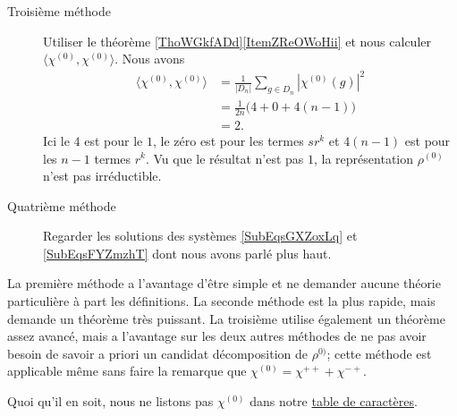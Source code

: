 \begin{enumerate}
\begin{description}
    \item[Troisième méthode]
        Utiliser le théorème \ref{ThoWGkfADd}\ref{ItemZReOWoHii} et nous calculer \( \langle \chi^{(0)}, \chi^{(0)}\rangle \). Nous avons
        \begin{subequations}
            \begin{align}
                \langle \chi^{(0)}, \chi^{(0)}\rangle &=\frac{1}{ | D_n | }\sum_{g\in D_n}| \chi^{(0)}(g) |^2\\
                &=\frac{1}{ 2n }\big(4+0+4(n-1)\big)\\
                &=2.
            \end{align}
        \end{subequations}
        Ici le \( 4\) est pour le \( 1\), le zéro est pour les termes \( sr^k\) et \( 4(n-1)\) est pour les \( n-1\) termes \( r^k\). Vu que le résultat n'est pas \( 1\), la représentation \( \rho^{(0)}\) n'est pas irréductible.
        
    \item[Quatrième méthode] 
        Regarder les solutions des systèmes \eqref{SubEqsGXZoxLq} et \eqref{SubEqsFYZmzhT} dont nous avons parlé plus haut.

    \end{description}

    La première méthode a l'avantage d'être simple et ne demander aucune théorie particulière à part les définitions. La seconde méthode est la plus rapide, mais demande un théorème très puissant. La troisième utilise également un théorème assez avancé, mais a l'avantage sur les deux autres méthodes de ne pas avoir besoin de savoir a priori un candidat décomposition de \( \rho^{0)}\); cette méthode est applicable même sans faire la remarque que \( \chi^{(0)}=\chi^{++}+\chi^{-+}\).

    Quoi qu'il en soit, nous ne listons pas \( \chi^{(0)}\) dans notre \href{http://fr.wikipedia.org/wiki/Aide:Unicode}{table de caractères}.


\end{enumerate}
